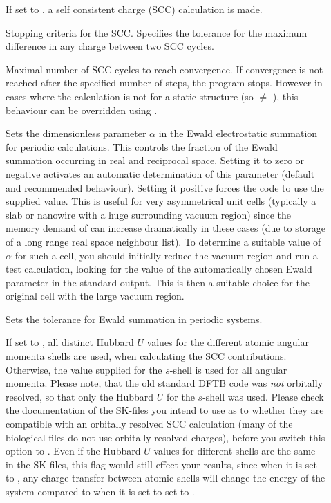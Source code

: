 \begin{description}
\item[] If set to , a self consistent charge (SCC)
  calculation is made.

\item[] Stopping criteria for the SCC.  Specifies the
  tolerance for the maximum difference in any charge between two SCC
  cycles.

\item[] Maximal number of SCC cycles to reach
  convergence. If convergence is not reached after the specified
  number of steps, the program stops. However in cases where the
  calculation is not for a static structure (so  $\neq$
  \cb), this behaviour can be overridden using
  .

\item[] Sets the dimensionless parameter $\alpha$
  in the Ewald electrostatic summation for periodic calculations. This
  controls the fraction of the Ewald summation occurring in real and
  reciprocal space. Setting it to zero or negative activates an
  automatic determination of this parameter (default and recommended
  behaviour). Setting it positive forces the code to use the supplied
  value. This is useful for very asymmetrical unit cells
  (typically a slab or nanowire with a huge surrounding vacuum region)
  since the memory demand of \dftbp{} can increase dramatically in
  these cases (due to storage of a long range real space neighbour
  list). To determine a suitable value of $\alpha$ for such a cell,
  you should initially reduce the vacuum region and run a test
  calculation, looking for the value of the automatically chosen Ewald
  parameter in the standard output. This is then a suitable choice for
  the original cell with the large vacuum region.

\item[] Sets the tolerance for Ewald summation in periodic
  systems.

\item[] If set to , all distinct
  Hubbard $U$ values for the different atomic angular momenta shells
  are used, when calculating the SCC contributions. Otherwise, the
  value supplied for the $s$-shell is used for all angular
  momenta. Please note, that the old standard DFTB code was \emph{not}
  orbitally resolved, so that only the Hubbard $U$ for the $s$-shell
  was used. Please check the documentation of the SK-files you intend
  to use as to whether they are compatible with an orbitally resolved
  SCC calculation (many of the biological files do not use orbitally
  resolved charges), before you switch this option to . Even
  if the Hubbard $U$ values for different shells are the same in the
  SK-files, this flag would still effect your results, since when it
  is set to , any charge transfer between atomic shells will
  change the energy of the system compared to when it is set to set to
  .


\end{description}
